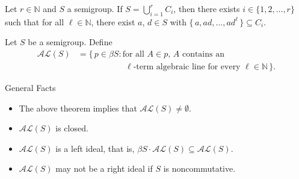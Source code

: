 \documentclass{beamer}
\newcommand{\bbN}{\mathbb{N}}
\begin{document}
\begin{frame}
  \begin{theorem}
    Let $r \in \bbN$ and $S$ a semigroup.
    If $S = \bigcup_{i=1}^r C_i$, then there exists $i \in \{1, 2,
    \ldots, r \}$ such that for all $\ell \in \bbN$, there exist $a$,
    $d \in S$ with $\{\, a, ad, \ldots, ad^\ell \,\} \subseteq C_i$. 
  \end{theorem}

  \pause

  \begin{definition}
    Let $S$ be a semigroup. 
    Define
    \vspace{-1em}
    \begin{align*}
      \mathcal{AL}(S) &= \{\, p \in \beta S : \mbox{for all $A \in
        p$, $A$ contains an} \\
      &\hspace{5em}\mbox{ $\ell$-term algebraic 
        line for every $\ell \in \bbN$} \,\}.
    \end{align*}
  \end{definition}

  \pause

  \begin{block}{General Facts}
    \begin{itemize}
      \item The above theorem implies that $\mathcal{AL}(S) \ne
        \emptyset$. 
        \pause

      \item  $\mathcal{AL}(S)$ is closed.
        \pause

      \item  $\mathcal{AL}(S)$ is a left ideal, that is, $\beta S \cdot
        \mathcal{AL}(S) \subseteq \mathcal{AL}(S)$. 
        \pause
      \item \alert{$\mathcal{AL}(S)$ may not be a right ideal if $S$ is 
          noncommutative.}
    \end{itemize}
  \end{block}
\end{frame}
\end{document}
